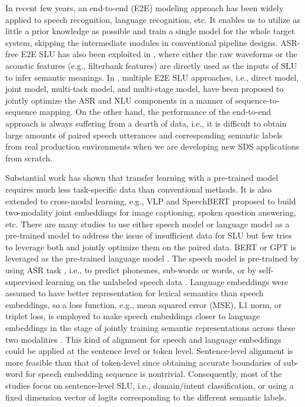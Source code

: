 \documentclass{article}
\begin{document}
In recent few years, an end-to-end (E2E) modeling approach has been widely applied to speech recognition, language recognition, etc. It enables us to utilize as little a prior knowledge as possible and train a single model for the whole target system, skipping the intermediate modules in conventional pipeline designs. ASR-free E2E SLU has also been exploited in \cite{qian2017exploring,chen2018spoken,haghani2018audio,lugosch2019speech,serdyuk2018towards,9053163}, where either the raw waveforms or the acoustic features (e.g., filterbank features) are directly used as the inputs of SLU to infer semantic meanings. In \cite{haghani2018audio}, multiple E2E SLU approaches, i.e., direct model, joint model, multi-task model, and multi-stage model, have been proposed to jointly optimize the ASR and NLU components in a manner of sequence-to-sequence mapping. On the other hand, the performance of the end-to-end approach is always suffering from a dearth of data, i.e., it is difficult to obtain large amounts of paired speech utterances and corresponding semantic labels from real production environments when we are developing new SDS applications from scratch. 





Substantial work has shown that transfer learning with a pre-trained model requires much less task-specific data than conventional methods. It is also extended to cross-modal learning, e.g., VLP \cite{zhou2019unified} and SpeechBERT \cite{chuang2020speechbert} proposed to build two-modality joint embeddings for image captioning, spoken question answering, etc. There are many studies to use either speech model or language model as a pre-trained model to address the issue of insufficient data for SLU but few tries to leverage both and jointly optimize them on the paired data. BERT or GPT is leveraged as the pre-trained language model \cite{huang-chen-2020-learning,yqian_interspeech2020}. The speech model is pre-trained by using ASR task \cite{lugosch2019speech,9053163,9053281}, i.e., to predict phonemes, sub-words or words, or by self-supervised learning on the unlabeled speech data \cite{chung2020semisupervised}. Language embeddings were assumed to have better representation for lexical semantics than speech embeddings, so a loss function, e.g., mean squared error (MSE), L1 norm, or triplet loss, is employed to make speech embeddings closer to language embeddings in the stage of jointly training semantic representations across these two modalities \cite{9053281,chung2020semisupervised}. This kind of alignment for speech and language embeddings could be applied at the sentence level or token level. Sentence-level alignment is more feasible than that of token-level since obtaining accurate boundaries of sub-word for speech embedding sequence is nontrivial. Consequently, most of the studies focus on sentence-level SLU, i.e., domain/intent classification, or using a fixed dimension vector of logits corresponding to the different semantic labels.
\end{document}
